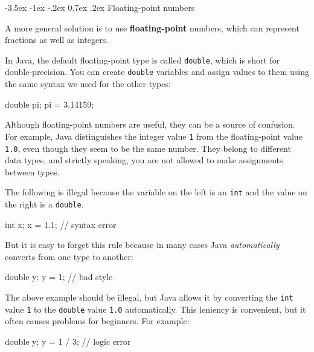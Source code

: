 \documentclass[12pt]{book}
\makeatletter
\renewcommand{\section}{\@startsection {section}{1}{\z@}%
    {-3.5ex \@plus -1ex \@minus -.2ex}%
    {0.7ex \@plus.2ex}%
    {\normalfont\Large\bfseries}}
\theoremstyle{exercise}
\newcommand{\java}[1]{\lstinline{#1}} %
\makeatother
\begin{document}
\section{Floating-point numbers}


A more general solution is to use {\bf floating-point} numbers, which can represent fractions as well as integers.

In Java, the default floating-point type is called \java{double}, which is short for double-precision.
You can create \java{double} variables and assign values to them using the same syntax we used for the other types:

\begin{code}
    double pi;
    pi = 3.14159;
\end{code}

Although floating-point numbers are useful, they can be a source of confusion.
For example, Java distinguishes the integer value \java{1} from the floating-point value \java{1.0}, even though they seem to be the same number.
They belong to different data types, and strictly speaking, you are not allowed to make assignments between types.

The following is illegal because the variable on the left is an \java{int} and the value on the right is a \java{double}.

\begin{code}
    int x;
    x = 1.1;  // syntax error
\end{code}

But it is easy to forget this rule because in many cases Java {\em automatically} converts from one type to another:

\begin{code}
    double y;
    y = 1;  // bad style
\end{code}

The above example should be illegal, but Java allows it by converting the \java{int} value \java{1} to the \java{double} value \java{1.0} automatically.
This leniency is convenient, but it often causes problems for beginners. For example:

\begin{code}
    double y;
    y = 1 / 3;  // logic error
\end{code}

\end{document}
